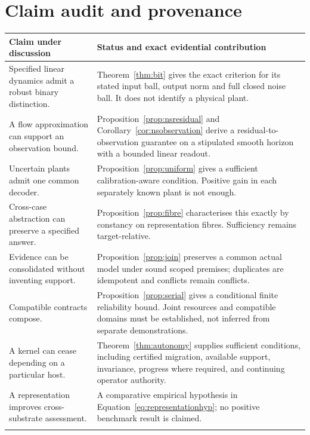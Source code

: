 \documentclass[11pt,a4paper]{article}
\theoremstyle{definition}
\theoremstyle{remark}
\begin{document}
\section{Claim audit and provenance}\label{app:audit}
\begingroup\small
\begin{longtable}{@{}>{\raggedright\arraybackslash}p{}>{\raggedright\arraybackslash}p{}@{}}
\toprule
Claim under discussion & Status and exact evidential contribution \\\midrule
\endhead
Specified linear dynamics admit a robust binary distinction. & Theorem~\ref{thm:bit} gives the exact criterion for its stated input ball, output norm and full closed noise ball. It does not identify a physical plant. \\\addlinespace
A flow approximation can support an observation bound. & Proposition~\ref{prop:nsresidual} and Corollary~\ref{cor:nsobservation} derive a residual-to-observation guarantee on a stipulated smooth horizon with a bounded linear readout. \\\addlinespace
Uncertain plants admit one common decoder. & Proposition~\ref{prop:uniform} gives a sufficient calibration-aware condition. Positive gain in each separately known plant is not enough. \\\addlinespace
Cross-case abstraction can preserve a specified answer. & Proposition~\ref{prop:fibre} characterises this exactly by constancy on representation fibres. Sufficiency remains target-relative. \\\addlinespace
Evidence can be consolidated without inventing support. & Proposition~\ref{prop:join} preserves a common actual model under sound scoped premises; duplicates are idempotent and conflicts remain conflicts. \\\addlinespace
Compatible contracts compose. & Proposition~\ref{prop:serial} gives a conditional finite reliability bound. Joint resources and compatible domains must be established, not inferred from separate demonstrations. \\\addlinespace
A kernel can cease depending on a particular host. & Theorem~\ref{thm:autonomy} supplies sufficient conditions, including certified migration, available support, invariance, progress where required, and continuing operator authority. \\\addlinespace
A representation improves cross-substrate assessment. & A comparative empirical hypothesis in Equation~\eqref{eq:representationhyp}; no positive benchmark result is claimed. \\\addlinespace

\end{longtable}
\end{document}
